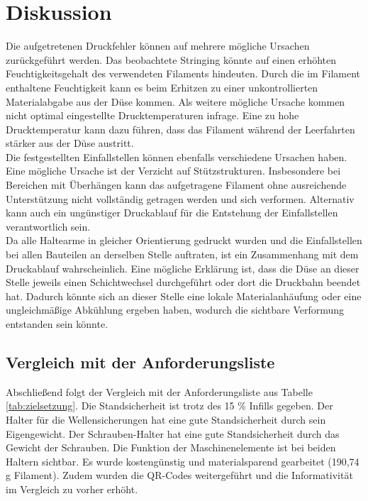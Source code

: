 \section{Diskussion}

Die aufgetretenen Druckfehler können auf mehrere mögliche Ursachen zurückgeführt werden. Das beobachtete Stringing könnte auf einen erhöhten Feuchtigkeitsgehalt des verwendeten Filaments hindeuten. Durch die im Filament enthaltene Feuchtigkeit kann es beim Erhitzen zu einer unkontrollierten Materialabgabe aus der Düse kommen. Als weitere mögliche Ursache kommen nicht optimal eingestellte Drucktemperaturen infrage. Eine zu hohe Drucktemperatur kann dazu führen, dass das Filament während der Leerfahrten stärker aus der Düse austritt.\\

Die festgestellten Einfallstellen können ebenfalls verschiedene Ursachen haben. Eine mögliche Ursache ist der Verzicht auf Stützstrukturen. Insbesondere bei Bereichen mit Überhängen kann das aufgetragene Filament ohne ausreichende Unterstützung nicht vollständig getragen werden und sich verformen. Alternativ kann auch ein ungünstiger Druckablauf für die Entstehung der Einfallstellen verantwortlich sein.\\

Da alle Haltearme in gleicher Orientierung gedruckt wurden und die Einfallstellen bei allen Bauteilen an derselben Stelle auftraten, ist ein Zusammenhang mit dem Druckablauf wahrscheinlich. Eine mögliche Erklärung ist, dass die Düse an dieser Stelle jeweils einen Schichtwechsel durchgeführt oder dort die Druckbahn beendet hat. Dadurch könnte sich an dieser Stelle eine lokale Materialanhäufung oder eine ungleichmäßige Abkühlung ergeben haben, wodurch die sichtbare Verformung entstanden sein könnte.

\subsection{Vergleich mit der Anforderungsliste}
Abschließend folgt der Vergleich mit der Anforderungsliste aus Tabelle \ref{tab:zielsetzung}. Die Standsicherheit ist trotz des 15 \% Infills gegeben. Der Halter für die Wellensicherungen hat eine gute Standsicherheit durch sein Eigengewicht. Der Schrauben-Halter hat eine gute Standsicherheit durch das Gewicht der Schrauben. Die Funktion der Maschinenelemente ist bei beiden Haltern sichtbar. Es wurde kostengünstig und materialsparend gearbeitet (190,74 g Filament). Zudem wurden die QR-Codes weitergeführt und die Informativität im Vergleich zu vorher erhöht.